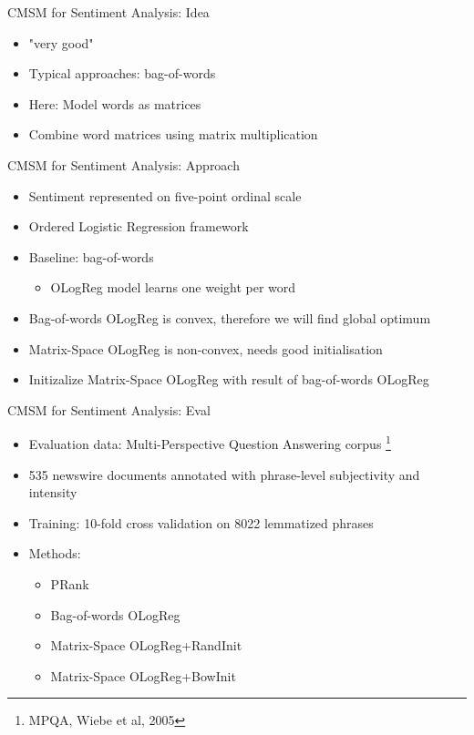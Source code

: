 \documentclass[12pt,a4paper]{beamer}
\begin{document}
\begin{frame}{CMSM for Sentiment Analysis: Idea}
\begin{itemize}
\item "very good"
\item Typical approaches: bag-of-words
\item Here: Model  words as matrices
\item Combine word matrices using matrix multiplication
\end{itemize}
\end{frame}

\begin{frame}{CMSM for Sentiment Analysis: Approach}
\begin{itemize}
\item Sentiment represented on five-point ordinal scale
\item Ordered Logistic Regression framework
\item Baseline: bag-of-words
\begin{itemize}
    \item OLogReg model learns one weight per word
\end{itemize}
\item Bag-of-words OLogReg is convex, therefore we will find global optimum
\item Matrix-Space OLogReg is non-convex, needs good initialisation
\item Initizalize Matrix-Space OLogReg with result of bag-of-words OLogReg
 
\end{itemize}
\end{frame}


\begin{frame}{CMSM for Sentiment Analysis: Eval}
\begin{itemize}
\item Evaluation data: Multi-Perspective Question Answering corpus \footnote{MPQA, Wiebe et al, 2005}
\item 535 newswire documents annotated with phrase-level subjectivity and intensity
\item Training: 10-fold cross validation on 8022 lemmatized phrases
\item Methods:
\begin{itemize}
    \item PRank
    \item Bag-of-words OLogReg
    \item Matrix-Space OLogReg+RandInit
    \item Matrix-Space OLogReg+BowInit
\end{itemize}
\end{itemize}
\end{frame}
\end{document}
